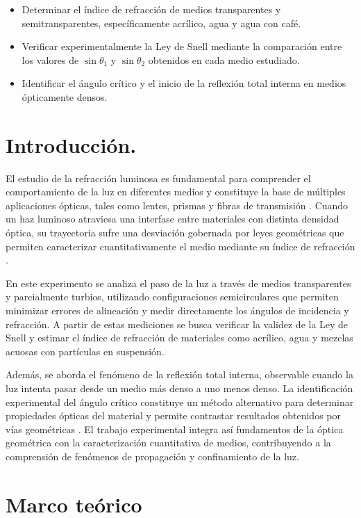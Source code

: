 \documentclass[11pt,twocolumn]{article}
\makeatletter
\let\orig@cite\cite
\renewcommand{\cite}[1]{\textcolor{Blue}{\orig@cite{#1}}}
\let\orig@parencite\parencite
\renewcommand{\parencite}[1]{\textcolor{Blue}{\orig@parencite{#1}}}
\renewcommand{\cite}[1]{\parencite{#1}}      %
\let\orig@cite\cite
\renewcommand{\cite}[1]{\textcolor{Blue}{\orig@cite{#1}}} %
\makeatother
\begin{document}
\begin{itemize}
    \item Determinar el índice de refracción de medios transparentes y semitransparentes, específicamente acrílico, agua y agua con café.
    \item Verificar experimentalmente la Ley de Snell mediante la comparación entre los valores de $\sin\theta_{1}$ y $\sin\theta_{2}$ obtenidos en cada medio estudiado.
    \item Identificar el ángulo crítico y el inicio de la reflexión total interna en medios ópticamente densos.
\end{itemize}

\section{Introducción.}

El estudio de la refracción luminosa es fundamental para comprender el comportamiento de la luz en diferentes medios y constituye la base de múltiples aplicaciones ópticas, tales como lentes, prismas y fibras de transmisión \cite{hecht_optics_2016}. Cuando un haz luminoso atraviesa una interfase entre materiales con distinta densidad óptica, su trayectoria sufre una desviación gobernada por leyes geométricas que permiten caracterizar cuantitativamente el medio mediante su índice de refracción \cite{serway_physics_2013}.

En este experimento se analiza el paso de la luz a través de medios transparentes y parcialmente turbios, utilizando configuraciones semicirculares que permiten minimizar errores de alineación y medir directamente los ángulos de incidencia y refracción. A partir de estas mediciones se busca verificar la validez de la Ley de Snell y estimar el índice de refracción de materiales como acrílico, agua y mezclas acuosas con partículas en suspensión.

Además, se aborda el fenómeno de la reflexión total interna, observable cuando la luz intenta pasar desde un medio más denso a uno menos denso. La identificación experimental del ángulo crítico constituye un método alternativo para determinar propiedades ópticas del material y permite contrastar resultados obtenidos por vías geométricas \cite{feynman_lectures_2010}. El trabajo experimental integra así fundamentos de la óptica geométrica con la caracterización cuantitativa de medios, contribuyendo a la comprensión de fenómenos de propagación y confinamiento de la luz.

\section{Marco teórico}
\end{document}
